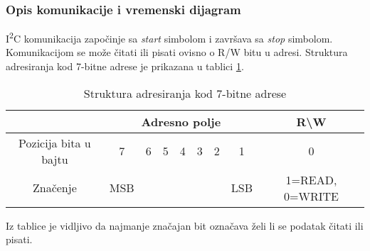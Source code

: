 \subsubsection{Opis komunikacije i vremenski dijagram}
I\textsuperscript{2}C komunikacija započinje sa \textit{start} simbolom i završava sa \textit{stop} simbolom. Komunikacijom se može čitati ili pisati ovisno o R/W bitu u adresi. Struktura adresiranja kod 7-bitne adrese je prikazana u tablici \ref{Tab:i2c_seven_bit_adressing}.
\begin{center}
	\begin{table}[H]
		\centering
		\caption{Struktura adresiranja kod 7-bitne adrese \cite{i2c_wikipedia}}
		\begin{tabular}{ | c | c | c | c | c | c | c | c | c | }
			\hline
			& \multicolumn{7}{|c|}{Adresno polje} & R\textbackslash W \\
			\hline
			Pozicija bita u bajtu & 7 & 6 & 5 & 4 & 3 & 2 & 1 & 0 \\
			\hline
			Značenje & MSB & \multicolumn{5}{|c|}{} & LSB & 1=READ, 0=WRITE \\
			\hline
		\end{tabular}
		\label{Tab:i2c_seven_bit_adressing}
	\end{table}
\end{center}
Iz tablice je vidljivo da najmanje značajan bit označava želi li se podatak čitati ili pisati.

